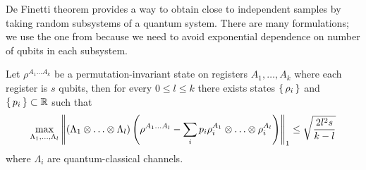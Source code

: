 De Finetti theorem provides a way to obtain close to independent samples by taking random subsystems of a quantum system.
There are many formulations; we use the one from \cite{Brandão2017} because we need to avoid exponential dependence on number of qubits in each subsystem.
\begin{thm}
	\label{deFinetti}
	Let $\rho^{A_1\ldots A_k}$ be a permutation-invariant state on registers $A_1,\ldots,A_k$ where each register is $s$ qubits,
	then for every $0\leq l\leq k$ there exists states $\set{\rho_i}$ and $\set{p_i}\subset\mathbb{R}$ such that
	$$\max_{\Lambda_1,\ldots,\Lambda_l}
	\left\lVert(\Lambda_1\otimes\ldots\otimes\Lambda_l)\left(\rho^{A_1\ldots A_l}-\sum_ip_i\rho_i^{A_1}\otimes\ldots\otimes\rho_i^{A_l}\right)\right\rVert_1
	\leq\sqrt{\frac{2l^2s}{k-l}}$$
	where $\Lambda_i$ are quantum-classical channels.
\end{thm}





